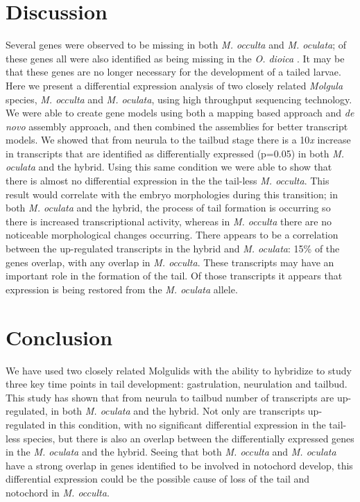 \section{Discussion}
Several genes were observed to be missing in both \textit{M. occulta} and \textit{M. oculata}; of these genes all were also identified as being missing in the \textit{O. dioica} \cite{kugler_evolutionary_2011}. It may be that these genes are no longer necessary for the development of a tailed larvae.
Here we present a differential expression analysis of two closely related \textit{Molgula} species, \textit{M. occulta} and \textit{M. oculata}, using high throughput sequencing technology. We were able to create gene models using both a mapping based approach and \textit{de novo} assembly approach, and then combined the assemblies for better transcript models. We showed that from neurula to the tailbud stage there is a 10\textit{x} increase in transcripts that are identified as differentially expressed (p=0.05) in both \textit{M. oculata} and the hybrid. Using this same condition we were able to show that there is almost no differential expression in the the tail-less \textit{M. occulta}. This result would correlate with the embryo morphologies during this transition; in both  \textit{M. oculata} and the hybrid, the process of tail formation is occurring so there is increased transcriptional activity, whereas in \textit{M. occulta} there are no noticeable morphological changes occurring. There appears to be a correlation between the up-regulated transcripts in the hybrid and \textit{M. oculata}: 15\% of the genes overlap, with any overlap in \textit{M. occulta}. These transcripts may have an important role in the formation of the tail. Of those transcripts it appears that expression is being restored from the \textit{M. oculata} allele.

\section{Conclusion}

We have used two closely related Molgulids with the ability to hybridize to study three key time points in tail development: gastrulation, neurulation and tailbud. This study has shown that from neurula to tailbud number of transcripts are up-regulated, in both \textit{M. oculata} and the hybrid. Not only are transcripts up-regulated in this condition, with no significant differential expression in the tail-less species, but there is also an overlap between the differentially expressed genes in the \textit{M. oculata} and the hybrid. Seeing that both \textit{M. occulta} and \textit{M. oculata} have a strong overlap in genes identified to be involved in notochord develop, this differential expression could be the possible cause of loss of the tail and notochord in \textit{M. occulta}.

